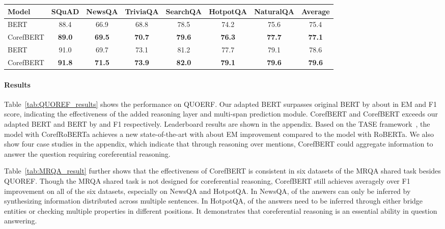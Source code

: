 \documentclass[11pt,a4paper]{article}
\newcommand\CorefBERT{CorefBERT\xspace}
\newcommand\BASESIZE{\xspace}
\newcommand\LARGESIZE{\xspace}
\begin{document}
\begin{table*}[!t]
\small
\centering
\setlength{\tabcolsep}{8pt}
\begin{tabular}{lccccccc}
\toprule

 Model &    {SQuAD} & {NewsQA}  & {TriviaQA} & {SearchQA} &{HotpotQA} &{NaturalQA} & Average  \\
\midrule
BERT\BASESIZE  & 88.4& 66.9 &68.8  & 78.5  & 74.2  & 75.6 & 75.4 \\
CorefBERT\BASESIZE  &   \bf{89.0}& \bf{69.5}& \bf{70.7} & \bf{79.6} & \bf{76.3} & \bf{77.7} & \bf{77.1}\\ 
\midrule
BERT\LARGESIZE  & 91.0& 69.7 & 73.1  & 81.2  & 77.7  & 79.1 & 78.6 \\
CorefBERT\LARGESIZE  &\bf{91.8} & \bf{71.5} &  \bf{73.9} & \bf{82.0}  & \bf{79.1}  & \bf{79.6} &  \bf{79.6}\\
\bottomrule
\end{tabular}
\caption{Performance (F1)  on six MRQA extractive question answering benchmarks.} \label{tab:MRQA_result}
\end{table*}










\vspace{-0.1em}
\paragraph{Results} Table~\ref{tab:QUOREF_results} shows the performance on QUOERF. Our
adapted BERT\BASESIZE surpasses original BERT by about  in EM and F1 score, indicating the effectiveness of the added reasoning layer and multi-span prediction module. CorefBERT\BASESIZE and CorefBERT\LARGESIZE  exceeds our adapted BERT\BASESIZE and BERT\LARGESIZE by   and  F1 respectively. Leaderboard results are shown in the appendix. Based on the TASE framework~\citep{TASE}, the model with CorefRoBERTa achieves a new state-of-the-art with about  EM improvement compared to the model with RoBERTa.
We also show four case studies in the appendix, which indicate that through reasoning over mentions, \CorefBERT could aggregate information to answer the question requiring coreferential reasoning. 




Table~\ref{tab:MRQA_result} further shows that the effectiveness of \CorefBERT is consistent in six datasets of the MRQA shared task besides QUOREF. Though the MRQA shared task is not designed for coreferential reasoning, CorefBERT still achieves averagely over  F1 improvement on all of the six datasets, especially on NewsQA and HotpotQA. In NewsQA,  of the answers can only be inferred by synthesizing information distributed across multiple sentences.  In HotpotQA,   of the answers need to be inferred through either bridge entities or checking multiple properties in different positions. It demonstrates that coreferential reasoning is an essential ability in question answering.
\end{document}
